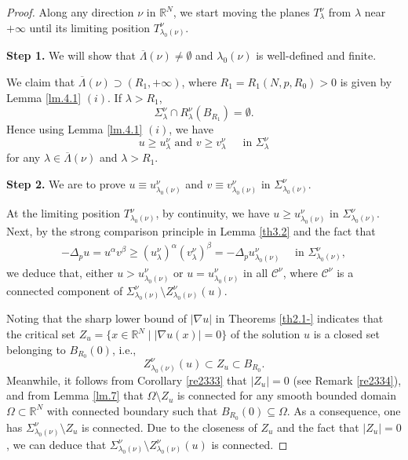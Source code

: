\documentclass[12pt]{amsart}
\theoremstyle{definition}
\theoremstyle{remark}
\theoremstyle{conclusion}
\theoremstyle{conjecture}
\numberwithin{equation}{section}
\newcommand{\R}{\mathbb{R}}
\begin{document}
\begin{proof}
Along any direction $\nu$ in $\R^N$, we start moving the planes $T^{\nu}_{\lambda}$ from $\lambda$ near $+\infty$ until its limiting position $T^{\nu}_{\lambda_{0}(\nu)}$.

\medskip

{\bf Step 1.} We will show that $\overline{\Lambda}(\nu)\neq\emptyset$ and $\lambda_0(\nu)$ is well-defined and finite.

We claim that $\overline{\Lambda}(\nu) \supset (R_1,+\infty)$, where $R_1=R_1(N,p,R_0)>0$ is given by Lemma \ref{lm.4.1} $(i)$. If $\lambda > R_1$,
$$ \Sigma_\lambda^\nu \cap R_\lambda^\nu(B_{R_1})=\emptyset.$$
Hence using Lemma \ref{lm.4.1} $(i)$, we have
$$ u\geq u_\lambda^\nu\,\,\mbox{and}\,\,v\geq v^\nu_\lambda \,\quad\,\,\mbox{in}\,\, \Sigma_\lambda^\nu $$
for any $\lambda\in\overline{\Lambda}(\nu)$ and $\lambda > R_1$.

\medskip

{\bf Step 2.} We are to prove $u \equiv u^\nu_{\lambda_0(\nu)}$ and $v \equiv v^\nu_{\lambda_0(\nu)}$ in $\Sigma^\nu_{\lambda_0(\nu)}$.

At the limiting position $T^{\nu}_{\lambda_0(\nu)}$, by continuity, we have $u\geq u^\nu_{\lambda_0(\nu)}$ in $\Sigma^\nu_{\lambda_0(\nu)}$. Next, by the strong comparison principle in Lemma \ref{th3.2} and the fact that
\begin{align}\label{eq2305}
-\Delta_p u =u^\alpha v^\beta \geq (u^\nu_\lambda)^\alpha (v^\nu_\lambda)^\beta= -\Delta_p u^{\nu}_{\lambda_0(\nu)} \quad\,\,\mbox{in}\,\,\Sigma^{\nu}_{\lambda_0(\nu)},
\end{align}
we deduce that, either $u>u^\nu_{\lambda_0(\nu)}$  or $u=u^\nu_{\lambda_0(\nu)}$ in all $\mathcal{C}^\nu$, where $\mathcal{C}^\nu$ is a connected component of $\Sigma^\nu_{\lambda_0(\nu)} \setminus Z^\nu_{\lambda_0(\nu)}(u)$.

Noting that the sharp lower bound of $|\nabla u|$ in Theorems \ref{th2.1-} indicates that the critical set $Z_u=\{x \in \R^N \mid |\nabla u(x)| = 0 \}$ of the solution $u$ is a closed set belonging to $B_{R_0}(0)$, i.e.,
$$Z^\nu_{\lambda_0(\nu)}(u)\subset Z_u \subset B_{R_0}.$$
Meanwhile, it follows from Corollary \ref{re2333} that $|Z_{u}|=0$ (see Remark \ref{re2334}), and from Lemma \ref{lm.7} that $\Omega\setminus Z_u$ is connected for any smooth bounded domain $\Omega\subset\mathbb{R}^{N}$ with connected boundary such that $B_{R_0}(0)\subseteq\Omega$. As a consequence, one has $\Sigma^\nu_{\lambda_0(\nu)}\setminus Z_u$ is connected. Due to the closeness of $Z_{u}$ and the fact that $|Z_{u}|=0$, we can deduce that $\Sigma^\nu_{\lambda_0(\nu)}\setminus Z^\nu_{\lambda_{0}(\nu)}(u)$ is connected.


\end{proof}
\end{document}
